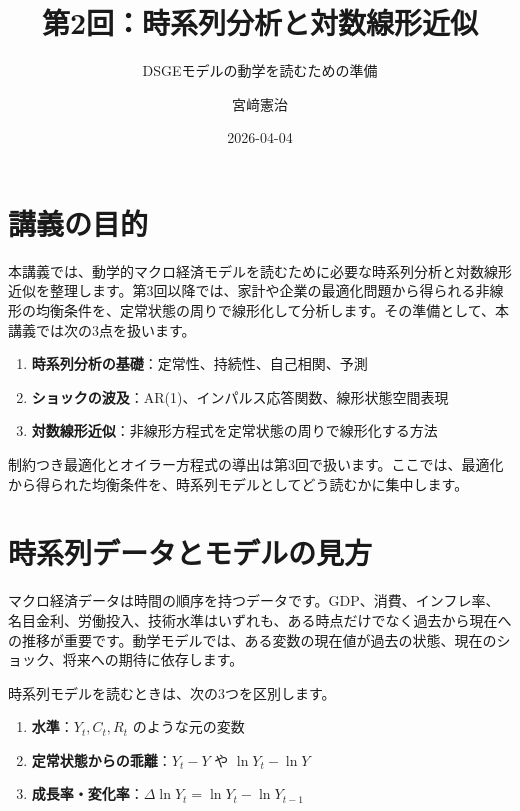 \documentclass[
  japanese,
  lualatex,
  ja=standard,
  12pt,
  a4paper]{ltjsarticle}
\title{第2回：時系列分析と対数線形近似}
\subtitle{DSGEモデルの動学を読むための準備}
\author{宮﨑憲治}
\date{2026-04-04}
\providecommand{\tightlist}{%
  \setlength{\itemsep}{0pt}\setlength{\parskip}{0pt}}
\renewcommand*\contentsname{目次}
\newcommand\contentsname{目次}
\begin{document}
\maketitle

\renewcommand*\contentsname{目次}
{
\setcounter{tocdepth}{3}
\tableofcontents
}

\section{講義の目的}\label{ux8b1bux7fa9ux306eux76eeux7684}

本講義では、動学的マクロ経済モデルを読むために必要な時系列分析と対数線形近似を整理します。第3回以降では、家計や企業の最適化問題から得られる非線形の均衡条件を、定常状態の周りで線形化して分析します。その準備として、本講義では次の3点を扱います。

\begin{enumerate}
\def\labelenumi{\arabic{enumi}.}
\tightlist
\item
  \textbf{時系列分析の基礎}：定常性、持続性、自己相関、予測
\item
  \textbf{ショックの波及}：AR(1)、インパルス応答関数、線形状態空間表現
\item
  \textbf{対数線形近似}：非線形方程式を定常状態の周りで線形化する方法
\end{enumerate}

制約つき最適化とオイラー方程式の導出は第3回で扱います。ここでは、最適化から得られた均衡条件を、時系列モデルとしてどう読むかに集中します。

\section{時系列データとモデルの見方}\label{ux6642ux7cfbux5217ux30c7ux30fcux30bfux3068ux30e2ux30c7ux30ebux306eux898bux65b9}

マクロ経済データは時間の順序を持つデータです。GDP、消費、インフレ率、名目金利、労働投入、技術水準はいずれも、ある時点だけでなく過去から現在への推移が重要です。動学モデルでは、ある変数の現在値が過去の状態、現在のショック、将来への期待に依存します。

時系列モデルを読むときは、次の3つを区別します。

\begin{enumerate}
\def\labelenumi{\arabic{enumi}.}
\tightlist
\item
  \textbf{水準}：\(Y_t, C_t, R_t\) のような元の変数
\item
  \textbf{定常状態からの乖離}：\(Y_t-Y\) や \(\ln Y_t-\ln Y\)
\item
  \textbf{成長率・変化率}：\(\Delta \ln Y_t=\ln Y_t-\ln Y_{t-1}\)
\end{enumerate}
\end{document}
